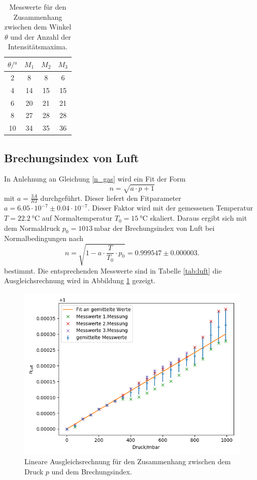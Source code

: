 \begin{table}
  \caption{Messwerte für den Zusammenhang zwischen dem Winkel $\theta$ und der Anzahl
  der Intensitätsmaxima.}
  \label{tab:glas}
  \centering
  \begin{tabular}{c|c|c|c}
    $\theta/°$ & $M_1$ & $M_2$ & $M_3$ \\ \midrule
    2 & 8 & 8 & 6 \\
    4 & 14  & 15  & 15 \\
    6 & 20  & 21  & 21 \\
    8 & 27  & 28  & 28 \\
    10 & 34 & 35  & 36
  \end{tabular}
\end{table}

\subsection{Brechungsindex von Luft}

In Anlehnung an Gleichung \ref{n_gas} wird ein Fit der Form
\[
n = \sqrt{a \cdot p + 1}
\]
mit $a = \frac{3A}{RT}$ durchgeführt. Dieser liefert den Fitparameter
$a = 6.05 \cdot 10^{-7} \pm 0.04 \cdot 10^{-7}$. Dieser Faktor wird mit der gemessenen Temperatur
$T = \SI{22.2}{\degreeCelsius}$ auf Normaltemperatur $T_0 = \SI{15}{\degreeCelsius}$ skaliert.
Daraus ergibt sich mit dem Normaldruck $p_0 = \SI{1013}{\milli\bar}$ der Brechungsindex von Luft bei
Normalbedingungen nach
\[
n = \sqrt{1 - a \cdot \frac{T}{T_0} \cdot p_0} = 0.999547 \pm 0.000003.
\]
bestimmt. Die entsprechenden Messwerte sind in Tabelle \ref{tab:luft} die Ausgleichsrechnung wird
in Abbildung \ref{n_luft} gezeigt.

\begin{figure}[h]
\centering
\includegraphics[width=\linewidth]{img/n_luft.png}
\caption{Lineare Ausgleichsrechnung für den Zusammenhang zwischen dem Druck $p$ und dem Brechungsindex.}
\label{n_luft}
\end{figure}

